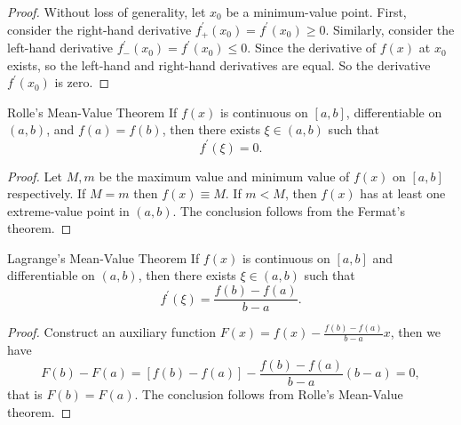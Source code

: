 \begin{proof}
  Without loss of generality, let $x_0$ be a minimum-value point.
  First, consider the right-hand derivative $f_+^{\prime}(x_0) = f^{\prime}(x_0)
  \geq 0$.
  Similarly, consider the left-hand derivative $f_-^{\prime}(x_0) =
  f^{\prime}(x_0) \leq 0$.
  Since the derivative of $f(x)$ at $x_0$ exists,
  so the left-hand and right-hand derivatives are equal.
  So the derivative $f^{\prime}(x_0)$ is zero.
\end{proof}

\begin{theorem}{Rolle's Mean-Value Theorem}{}
  If $f(x)$ is continuous on $[a, b]$,
  differentiable on $(a, b)$,
  and $f(a) = f(b)$,
  then there exists $\xi \in (a, b)$ such that
  \begin{equation}
    f^{\prime}(\xi) = 0.
  \end{equation}
\end{theorem}

\begin{proof}
  Let $M, m$ be the maximum value and minimum value of $f(x)$ on $[a, b]$ respectively.
  If $M = m$ then $f(x) \equiv M$.
  If $m < M$, then $f(x)$ has at least one extreme-value point in $(a, b)$.
  The conclusion follows from the Fermat's theorem.
\end{proof}

\begin{theorem}{Lagrange's Mean-Value Theorem}{}
  If $f(x)$ is continuous on $[a, b]$ and differentiable on $(a, b)$,
  then there exists $\xi \in (a, b)$ such that
  \begin{equation}
    f^{\prime}(\xi) = \frac{f(b) - f(a)}{b - a}.
  \end{equation}
\end{theorem}

\begin{proof}
  Construct an auxiliary function
  $F(x) = f(x) - \frac{f(b) - f(a)}{b - a}x$,
  then we have
  \begin{equation}
    F(b) - F(a) = \left[ f(b) - f(a) \right]
    - \frac{f(b) - f(a)}{b - a}(b - a) = 0,
  \end{equation}
  that is $F(b) = F(a)$.
  The conclusion follows from Rolle's Mean-Value theorem.
\end{proof}

